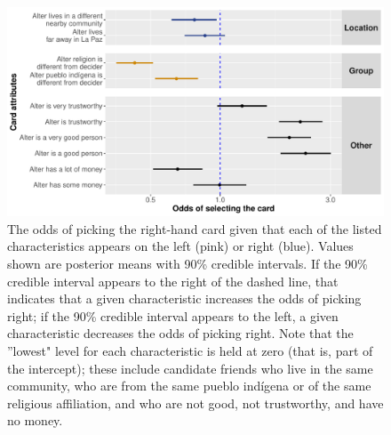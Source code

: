 \documentclass[bibauthoryear]{aa}
\begin{document}
 \begin{figure}[t]
 \centering
\includegraphics[width=5in]{Bolivia_CardChoice_Non-Standardized} %
\caption{{\footnotesize The odds of picking the right-hand card given that each of the listed characteristics appears on the left (pink) or right (blue). Values shown are posterior means with 90\% credible intervals. If the 90\% credible interval appears to the right of the dashed line, that indicates that a given characteristic increases the odds of picking right; if the 90\% credible interval appears to the left, a given characteristic decreases the odds of picking right. Note that the ''lowest" level for each characteristic is held at zero (that is, part of the intercept); these include candidate friends who live in the same community, who are from the same pueblo ind\'igena or of the same religious affiliation, and who are not good, not trustworthy, and have no money.}
} \label{boliviacards}
\end{figure}
\end{document}
